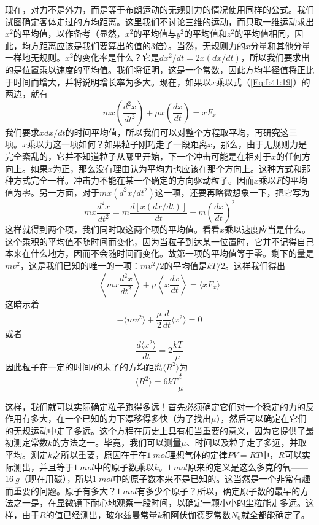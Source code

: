 现在，对力不是外力，而是等于布朗运动的无规则力的情况使用同样的公式。我们试图确定客体走过的方均距离。这里我们不讨论三维的运动，而只取一维运动求出$x^2$的平均值，以作备考（显然，$x^2$的平均值与$y^2$的平均值和$z^2$的平均值相同，因此，均方距离应该是我们要算出的值的3倍）。当然，无规则力的$x$分量和其他分量一样地无规则。$x^2$的变化率是什么？它是$dx^2/dt=2x(dx/dt)$，所以我们要求出的是位置乘以速度的平均值。我们将证明，这是一个常数，因此方均半径值将正比于时间而增大，并将说明增长率为多大。现在，如果以$x$乘以式（\ref{Eq:I:41:19}）的两边，就有
\begin{equation*}
    mx\left ( \frac{d^2x}{dt^2} \right ) + \mu x \left ( \frac{dx}{dt} \right ) = xF_x
\end{equation*}
我们要求$xdx/dt$的时间平均值，所以我们可以对整个方程取平均，再研究这三项。$x$乘以力这一项如何？如果粒子刚巧走了一段距离$x$，那么，由于无规则力是完全紊乱的，它并不知道粒子从哪里开始，下一个冲击可能是在相对于$x$的任何方向上。如果$x$为正，那么没有理由认为平均力也应该在那个方向上。这种方式和那种方式完全一样。冲击力不能在某一个确定的方向驱动粒子。因而$x$乘以$F$的平均值为零。另一方面，对于$mx(d^2x/dt^2)$这一项，还要再略微想象一下，把它写为
\begin{equation*}
    mx\frac{d^2x}{dt^2} = m\frac{d[x(dx/dt)]}{dt} - m \left ( \frac{dx}{dt} \right )^2
\end{equation*}
这样就得到两个项，我们同时取这两个项的平均值。看看$x$乘以速度应当是什么。这个乘积的平均值不随时间而变化，因为当粒子到达某一位置时，它并不记得自己本来在什么地方，因而不会随时间而变化。故第一项的平均值等于零。剩下的量是$mv^2$，这是我们已知的唯一的一项：$mv^2/2$的平均值是$kT/2$。这样我们得出
\begin{equation*}
    \left \langle mx\frac{d^2x}{dt^2} \right \rangle + \mu \left \langle x\frac{dx}{dt} \right \rangle = \langle xF_x \rangle
\end{equation*}
这暗示着
\begin{equation*}
    -\langle mv^2 \rangle + \frac{\mu}{2}\frac{d}{dt}\langle x^2 \rangle = 0
\end{equation*}
或者
\begin{equation}
    \label{Eq:I:41:20}
    \frac{d\langle x^2 \rangle}{dt} = 2\frac{kT}{\mu}
\end{equation}
因此粒子在一定的时间$t$的末了的方均距离$\langle R^2 \rangle$为
\begin{equation}
    \label{Eq:I:41:21}
    \langle R^2 \rangle = 6kT\frac{t}{\mu}
\end{equation}

这样，我们就可以实际确定粒子跑得多远！首先必须确定它们对一个稳定的力的反作用有多大，在一个已知的力下漂移得多快（为了找出$\mu$），然后可以确定在它们的无规运动中走了多远。这个方程在历史上具有相当重要的意义，因为它提供了最初测定常数$k$的方法之一。毕竟，我们可以测量$\mu$、时间以及粒子走了多远，并取平均。测定$k$之所以重要，原因在于在$1~mol$理想气体的定律$PV=RT$中，$R$可以实际测出，并且等于$1~mol$中的原子数乘以$k$。$1~mol$原来的定义是这么多克的氧——$16~g$（现在用碳），所以$1~mol$中的原子数本来不是已知的。这当然是一个非常有趣而重要的问题。原子有多大？$1~mol$有多少个原子？所以，确定原子数的最早的方法之一是，在显微镜下耐心地观察一段时间，以确定一颗小小的尘粒能走多远。这样，由于$R$的值已经测出，玻尔兹曼常量$k$和阿伏伽德罗常数$N_0$就全都能确定了。